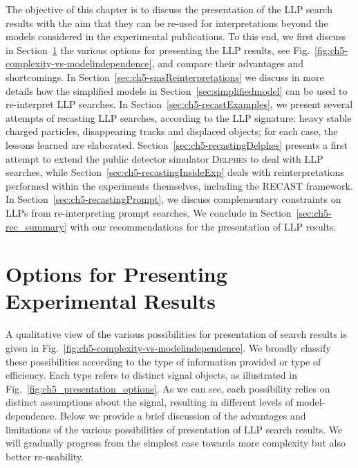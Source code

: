 The objective of this chapter is to discuss the presentation of the LLP search results  
with the aim that they can be re-used for interpretations beyond the models considered in the 
experimental publications.  
To this end, we first discuss in Section~\ref{sec:ch5-options} the various options 
for presenting the LLP results, see Fig.~\ref{fig:ch5-complexity-vs-modelindependence}, and compare their advantages and
shortcomings. 
In Section~\ref{sec:ch5-smsReinterpretations} we discuss in more details how the simplified models in Section~\ref{sec:simplifiedmodel} can be used to re-interpret LLP searches. 
In Section~\ref{sec:ch5-recastExamples}, we present several attempts of recasting LLP searches, 
according to the LLP signature: heavy stable charged particles,
disappearing tracks and displaced objects; for each case, the lessons learned are elaborated. 
Section~\ref{sec:ch5-recastingDelphes} presents a first attempt to
extend the public detector simulator \textsc{Delphes} %
to deal with LLP searches, while 
Section~\ref{sec:ch5-recastingInsideExp} deals with reinterpretations performed within the experiments themselves, 
including the RECAST framework.  
In Section~\ref{sec:ch5-recastingPrompt}, we discuss complementary constraints on LLPs from re-interpreting prompt searches. 
We conclude in Section~\ref{sec:ch5-rec_summary} with our %
recommendations for the presentation of LLP results. 


\section{Options for Presenting Experimental Results} 
\label{sec:ch5-options}

A qualitative view of the various possibilities for presentation
of search results is given in
Fig.~\ref{fig:ch5-complexity-vs-modelindependence}.
We broadly classify these possibilities according to the type of
information provided or type of efficiency.
Each type refers to distinct signal objects, as illustrated in
Fig.~\ref{fig:ch5_presentation_options}.
As we can see, each possibility relies on distinct assumptions about
the signal, resulting in different levels of model-dependence.
Below we provide a brief discussion of the advantages and limitations of the
various possibilities of presentation of LLP search results.
We will gradually progress from the simplest case towards more complexity but
also better re-usability.


